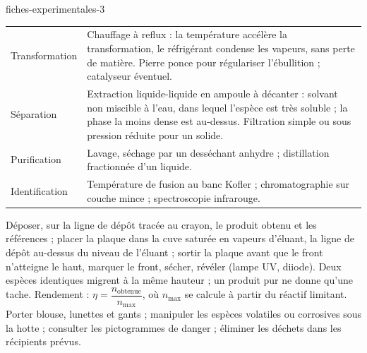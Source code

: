 \begin{blocEdition}{fiches-experimentales-3}
\fontsize{10}{13.5}\selectfont
\label{figedition-fiches-3}
\begin{tabularx}{\linewidth}{@{}p{30mm}Y@{}}\toprule
Transformation & Chauffage à reflux : la température accélère la transformation, le réfrigérant condense les vapeurs, sans
perte de matière. Pierre ponce pour régulariser l'ébullition ; catalyseur éventuel. \\[1mm]
Séparation & Extraction liquide-liquide en ampoule à décanter : solvant non miscible à l'eau, dans lequel l'espèce est très
soluble ; la phase la moins dense est au-dessus. Filtration simple ou sous pression réduite pour un solide. \\[1mm]
Purification & Lavage, séchage par un desséchant anhydre ; distillation fractionnée d'un liquide. \\[1mm]
Identification & Température de fusion au banc Kofler ; chromatographie sur couche mince ; spectroscopie infrarouge. \\\bottomrule
\end{tabularx}
Déposer, sur la ligne de dépôt tracée au crayon, le produit obtenu et les références ; placer la plaque dans la cuve saturée
en vapeurs d'éluant, la ligne de dépôt au-dessus du niveau de l'éluant ; sortir la plaque avant que le front n'atteigne le
haut, marquer le front, sécher, révéler (lampe UV, diiode). Deux espèces identiques migrent à la même hauteur ; un produit
pur ne donne qu'une tache.
Rendement : $\eta=\dfrac{n_\text{obtenue}}{n_\text{max}}$, où $n_\text{max}$ se calcule à partir du réactif limitant. Porter blouse, lunettes et gants ;
manipuler les espèces volatiles ou corrosives sous la hotte ; consulter les pictogrammes de danger ; éliminer les déchets dans
les récipients prévus.
\end{blocEdition}

